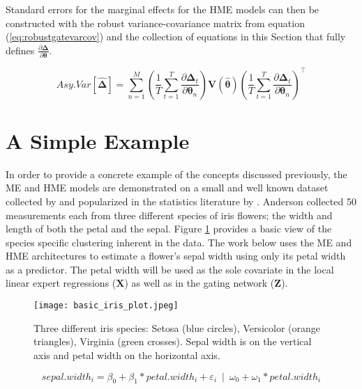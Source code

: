 \documentclass[12pt]{article}
\theoremstyle{definition}
\begin{document}
Standard errors for the marginal effects for the HME models can then be
constructed with the robust variance-covariance matrix from equation
(\ref{eq:robustgatevarcov}) and the collection of equations in this Section
that fully defines $\frac{\partial \boldsymbol{\Delta}}{\partial \boldsymbol{\theta}}$.


\begin{equation} \label{eq:std_errs_full_marginal_effects}
  Asy.Var \left[ \boldsymbol{ \hat{ \Delta } } \right] = \sum^{M}_{n=1}  \left( \frac{1}{T} \sum^{T}_{t=1} \frac{\partial \boldsymbol{\Delta}_{t}}{\partial \boldsymbol{\theta}_{n}} \right)     \boldsymbol{V}(\boldsymbol{\hat{\theta}})      \left( \frac{1}{T} \sum^{T}_{t=1} \frac{\partial \boldsymbol{\Delta}_{t}}{\partial \boldsymbol{\theta}_{n}} \right)^\top
\end{equation} 

\section{A Simple Example} \label{sec:SimpleExample}

In order to provide a concrete example of the concepts discussed previously,
the ME and HME models are demonstrated on a small and well known dataset
collected by \citet{Anderson1936} and popularized in the
statistics literature by \citet{Fisher1936}. Anderson collected
50 measurements each from three different species of iris flowers; the width and
length of both the petal and the sepal. Figure \ref{fig:Iris_dataset} provides a
basic view of the species specific clustering inherent in the data.
The work below uses the ME and HME architectures to estimate a flower's sepal
width using only its petal width as a predictor. The petal width will be used
as the sole covariate in the local linear expert regressions ($\boldsymbol{X}$) as well as
in the gating network ($\boldsymbol{Z}$). 

\begin{figure}[!ht]
  \texttt{[image: basic\_iris\_plot.jpeg]}
  \caption{Three different iris species: Setosa
  (blue circles), Versicolor (orange triangles), Virginia (green crosses).
  Sepal width is on the vertical axis and petal width on the horizontal
  axis.}
  \label{fig:Iris_dataset}
\end{figure}



\begin{equation} \label{eq:HME_iris}
    sepal.width_{i} = \beta_{0} + \beta_{1} * petal.width_{i} + \varepsilon_{i} \enspace | \enspace \omega_{0} + \omega_{1} * petal.width_{i}
\end{equation}
\end{document}
